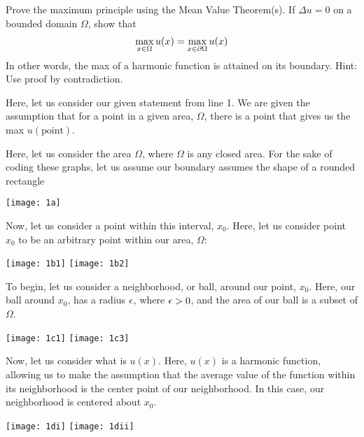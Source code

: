 \item Prove the maximum principle using the Mean Value Theorem(s). If $\Delta u = 0$ on a bounded domain $\Omega$, show that
%
\begin{align}
  \max_{x \in \Omega} u(x) = \max_{x \in \partial \Omega} u(x)
\end{align}
In other words, the max of a harmonic function is attained on its boundary. Hint: Use proof by contradiction.
\bigbreak

Here, let us consider our given statement from line 1. We are given the assumption that for a point in a given area, $\Omega$, there is a point that gives us the max $u(\text{point})$.

Here, let us consider the area $\Omega$, where $\Omega$ is any closed area.
For the sake of coding these graphs, let us assume our boundary assumes the shape of a rounded rectangle %

\begin{center}
  \texttt{[image: 1a]}
\end{center}

Now, let us consider a point within this interval, $x_0$. Here, let us consider point $x_0$ to be an arbitrary point within our area, $\Omega$:

\begin{center}
  \texttt{[image: 1b1]}
  \texttt{[image: 1b2]}
\end{center}

To begin, let us consider a neighborhood, or ball, around our point, $x_0$. Here, our ball around $x_0$, has a radius $\epsilon$, where $\epsilon > 0$, and the area of our ball is a subset of $\Omega$.

\begin{center}
  \texttt{[image: 1c1]}
  \texttt{[image: 1c3]}
\end{center}

Now, let us consider what is $u(x)$. Here, $u(x)$ is a harmonic function,
allowing us to make the assumption that the average value of the function
within its neighborhood is the center point of our neighborhood. In this case,
our neighborhood is centered about $x_0$.

\begin{center}
  \texttt{[image: 1di]}
  \texttt{[image: 1dii]}
\end{center}

